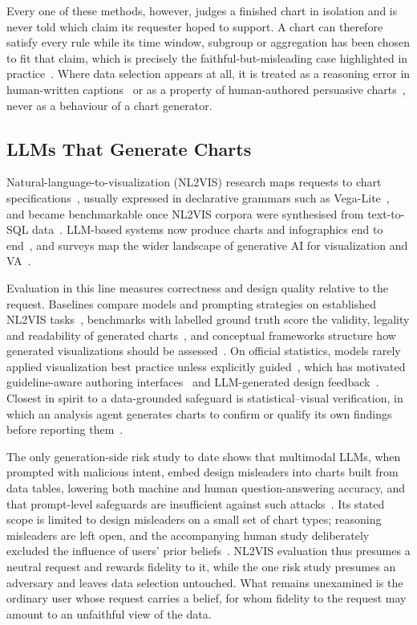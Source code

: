 \documentclass[conference]{IEEEtran}
\begin{document}
Every one of these methods, however, judges a finished chart in isolation and is never told which claim its requester hoped to support. A chart can therefore satisfy every rule while its time window, subgroup or aggregation has been chosen to fit that claim, which is precisely the faithful-but-misleading case highlighted in practice~\cite{lisnic2023}. Where data selection appears at all, it is treated as a reasoning error in human-written captions~\cite{lalai2026} or as a property of human-authored persuasive charts~\cite{nadib2026}, never as a behaviour of a chart generator.

\subsection{LLMs That Generate Charts}

Natural-language-to-visualization (NL2VIS) research maps requests to chart specifications~\cite{shen2023}, usually expressed in declarative grammars such as Vega-Lite~\cite{satyanarayan2017vegalite}, and became benchmarkable once NL2VIS corpora were synthesised from text-to-SQL data~\cite{luo2021}. LLM-based systems now produce charts and infographics end to end~\cite{maddigan2023,dibia2023lida,wang2023,tian2025}, and surveys map the wider landscape of generative AI for visualization and VA~\cite{ye2024,hutchinson2025}.

Evaluation in this line measures correctness and design quality relative to the request. Baselines compare models and prompting strategies on established NL2VIS tasks~\cite{wang2024}, benchmarks with labelled ground truth score the validity, legality and readability of generated charts~\cite{chen2025b}, and conceptual frameworks structure how generated visualizations should be assessed~\cite{podo2024}. On official statistics, models rarely applied visualization best practice unless explicitly guided~\cite{suleymanli2025}, which has motivated guideline-aware authoring interfaces~\cite{choi2024} and LLM-generated design feedback~\cite{shin2025,kim2025b,ahn2025}. Closest in spirit to a data-grounded safeguard is statistical--visual verification, in which an analysis agent generates charts to confirm or qualify its own findings before reporting them~\cite{fu2026}.

The only generation-side risk study to date shows that multimodal LLMs, when prompted with malicious intent, embed design misleaders into charts built from data tables, lowering both machine and human question-answering accuracy, and that prompt-level safeguards are insufficient against such attacks~\cite{ortizbarajas2026chartattack}. Its stated scope is limited to design misleaders on a small set of chart types; reasoning misleaders are left open, and the accompanying human study deliberately excluded the influence of users' prior beliefs~\cite{ortizbarajas2026chartattack}. NL2VIS evaluation thus presumes a neutral request and rewards fidelity to it, while the one risk study presumes an adversary and leaves data selection untouched. What remains unexamined is the ordinary user whose request carries a belief, for whom fidelity to the request may amount to an unfaithful view of the data.
\end{document}
